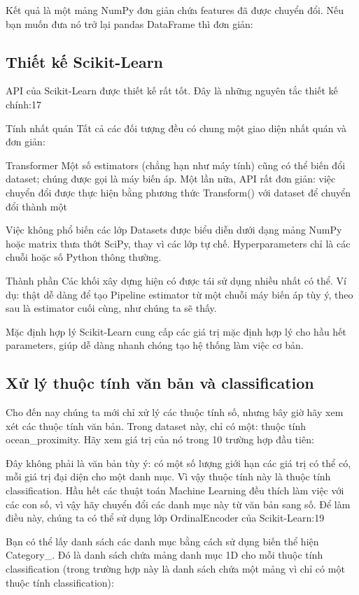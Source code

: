 Kết quả là một mảng NumPy đơn giản chứa features đã được chuyển đổi. Nếu bạn muốn đưa nó trở lại pandas DataFrame thì đơn giản:

\subsection{Thiết kế Scikit-Learn}

API của Scikit-Learn được thiết kế rất tốt. Đây là những nguyên tắc thiết kế chính:17

Tính nhất quán Tất cả các đối tượng đều có chung một giao diện nhất quán và đơn giản:

Transformer Một số estimators (chẳng hạn như máy tính) cũng có thể biến đổi dataset; chúng được gọi là máy biến áp. Một lần nữa, API rất đơn giản: việc chuyển đổi được thực hiện bằng phương thức Transform() với dataset để chuyển đổi thành một

Việc không phổ biến các lớp Datasets được biểu diễn dưới dạng mảng NumPy hoặc matrix thưa thớt SciPy, thay vì các lớp tự chế. Hyperparameters chỉ là các chuỗi hoặc số Python thông thường.

Thành phần Các khối xây dựng hiện có được tái sử dụng nhiều nhất có thể. Ví dụ: thật dễ dàng để tạo Pipeline estimator từ một chuỗi máy biến áp tùy ý, theo sau là estimator cuối cùng, như chúng ta sẽ thấy.

Mặc định hợp lý Scikit-Learn cung cấp các giá trị mặc định hợp lý cho hầu hết parameters, giúp dễ dàng nhanh chóng tạo hệ thống làm việc cơ bản.

\subsection{Xử lý thuộc tính văn bản và classification}

Cho đến nay chúng ta mới chỉ xử lý các thuộc tính số, nhưng bây giờ hãy xem xét các thuộc tính văn bản. Trong dataset này, chỉ có một: thuộc tính ocean\_proximity. Hãy xem giá trị của nó trong 10 trường hợp đầu tiên:

Đây không phải là văn bản tùy ý: có một số lượng giới hạn các giá trị có thể có, mỗi giá trị đại diện cho một danh mục. Vì vậy thuộc tính này là thuộc tính classification. Hầu hết các thuật toán Machine Learning đều thích làm việc với các con số, vì vậy hãy chuyển đổi các danh mục này từ văn bản sang số. Để làm điều này, chúng ta có thể sử dụng lớp OrdinalEncoder của Scikit-Learn:19

Bạn có thể lấy danh sách các danh mục bằng cách sử dụng biến thể hiện Category\_. Đó là danh sách chứa mảng danh mục 1D cho mỗi thuộc tính classification (trong trường hợp này là danh sách chứa một mảng vì chỉ có một thuộc tính classification):

